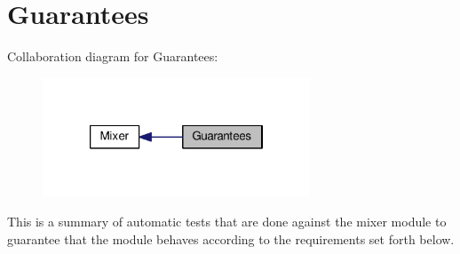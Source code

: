 \hypertarget{group__MIXERSPEC}{\section{Guarantees}
\label{group__MIXERSPEC}
}
Collaboration diagram for Guarantees\+:\nopagebreak
\begin{figure}[H]
\begin{center}
\leavevmode
\includegraphics[width=226pt]{group__MIXERSPEC}
\end{center}
\end{figure}
This is a summary of automatic tests that are done against the mixer module to guarantee that the module behaves according to the requirements set forth below. 